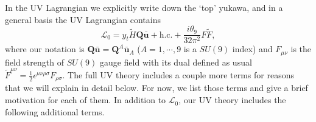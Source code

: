 \documentclass[11pt,a4paper]{article}
\begin{document}
In the UV Lagrangian we explicitly write down the `top' yukawa, and in a general basis the UV Lagrangian contains
%
\begin{equation}
    \mathcal{L}_0 = y_t \tilde{H} \mathbf{Q} \mathbf{\bar u} + \text{h.c.} + \frac{i \theta_9}{32\pi^2} F \tilde{F},
\end{equation}
%
where our notation is $\mathbf{Q} \mathbf{\bar u} = \mathbf{Q}^A \mathbf{\bar u}_A$ ($A=1,\cdots, 9$ is a $SU(9)$ index) and $F_{\mu\nu}$ is the field strength of $SU(9)$ gauge field with its dual defined as usual $\tilde{F}^{\mu\nu} = \frac{1}{2} \epsilon^{\mu\nu\rho\sigma} F_{\rho\sigma}$.
The full UV theory includes a couple more terms for reasons that we will explain in detail below. For now, we list those terms and give a brief motivation for each of them. In addition to $\mathcal{L}_0$, our UV theory includes the following additional terms.
%
\end{document}
